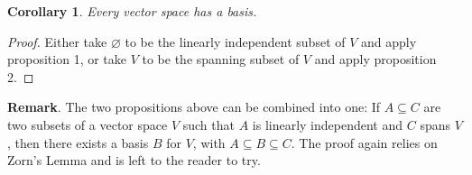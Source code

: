 \documentclass[12pt]{article}
\newtheorem{cor}{Corollary}
\begin{document}
\begin{cor} Every vector space has a basis. \end{cor}
\begin{proof} Either take $\varnothing$ to be the linearly independent subset of $V$ and apply proposition 1, or take $V$ to be the spanning subset of $V$ and apply proposition 2. \end{proof}

\textbf{Remark}.  The two propositions above can be combined into one: If $A\subseteq C$ are two subsets of a vector space $V$ such that $A$ is linearly independent and $C$ spans $V$, then there exists a basis $B$ for $V$, with $A\subseteq B\subseteq C$.  The proof again relies on Zorn's Lemma and is left to the reader to try.
\end{document}

